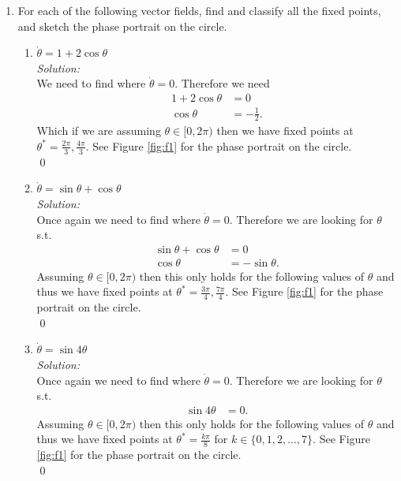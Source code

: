 \documentclass[10pt]{amsart}
\theoremstyle{nonumberplain}
\begin{document}
\begin{enumerate}[label={\bf {\arabic*}:}]
\item For each of the following vector fields, find and classify all the fixed points, and
sketch the phase portrait on the circle. \\
\begin{enumerate}

\item $\dot \theta = 1 + 2 \cos \theta$ \\
\textit{Solution:} \\
We need to find where $\dot \theta = 0$.
Therefore we need 
\begin{align*}
1 + 2 \cos \theta &= 0 \\
\cos \theta &= -\frac 1 2.
\end{align*}
Which if we are assuming $\theta \in [0, 2 \pi)$ then we have fixed points at $\theta^* = \frac {2 \pi} 3, \frac {4 \pi} 3$.
See Figure \ref{fig:f1} for the phase portrait on the circle. \\
\qed \\

\item $\dot \theta = \sin \theta + \cos \theta$ \\
\textit{Solution:} \\
Once again we need to find where $\dot \theta = 0$.
Therefore we are looking for $\theta$ s.t.
\begin{align*}
\sin \theta + \cos \theta &= 0 \\
\cos \theta &= -\sin \theta.
\end{align*}
Assuming $\theta \in [0, 2 \pi)$ then this only holds for the following values of $\theta$ and thus we have fixed points at $\theta^* = \frac {3 \pi} 4, \frac {7 \pi} 4$.
See Figure \ref{fig:f1} for the phase portrait on the circle. \\
\qed \\

\item $\dot \theta = \sin 4 \theta$ \\
\textit{Solution:} \\
Once again we need to find where $\dot \theta = 0$.
Therefore we are looking for $\theta$ s.t.
\begin{align*}
\sin 4 \theta &= 0.
\end{align*}
Assuming $\theta \in [0, 2 \pi)$ then this only holds for the following values of $\theta$ and thus we have fixed points at $\theta^* = \frac {k \pi} 8$ for $k \in \{0, 1, 2, ..., 7\}$.
See Figure \ref{fig:f1} for the phase portrait on the circle. \\
\qed \\


\end{enumerate}
\end{enumerate}
\end{document}
